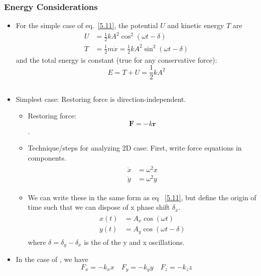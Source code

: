\documentclass[10pt, twocolumn]{article}
\begin{document}
\subsubsection{Energy Considerations}
\begin{itemize}
	\item For the simple case of eq.~\ref{5.11}, the potential $U$ and kinetic energy $T$ are
	\begin{align}
		U &= \frac{1}{2} k A^2 \cos^2(\omega t - \delta)  \\
		T &= \frac{1}{2}m \dot{x} = \frac{1}{2} k A^2 \sin^2(\omega t - \delta)
	\end{align}
	and the total energy is constant (true for any conservative force):
	\begin{equation}
		E = T + U = \frac{1}{2} k A^2 
		\label{5.16}
	\end{equation}
\end{itemize}


\subsection{}
\begin{itemize}
	\item Simplest case:  Restoring force is direction-independent.
	\begin{itemize}
		\item Restoring force:
			\begin{equation} \bm{F} = -k \bm{r} \label{5.17} \end{equation}.
		\item Technique/steps for analyzing 2D case: First, write force equations in components.
		\begin{align}
		\begin{split}
			\ddot{x} &= \omega^2 x \\
			\ddot{y} &= \omega^2 y
		\end{split}
		\label{5.18}
		\end{align}
		\item We can write these in the same form as eq ~\ref{5.11}, but define the origin of time such that we can dispose of x phase shift $\delta_x$. 
		\begin{align} \tag{5.20}
		\begin{split}
			x(t) &= A_x \cos(\omega t) \\
			y(t) &= A_y \cos(\omega t - \delta)
		\end{split}
		\label{5.20}
		\end{align}
		where $\delta = \delta_y - \delta_x$ is the  of the y and x oscillations. 
	\end{itemize}
	\item In the case of , we have
	\begin{equation} \tag{5.21}
		F_x = -k_x x \quad F_y = -k_y y \quad F_z = -k_z z 
		\label{5.21}
	\end{equation}
\end{itemize}
\end{document}
